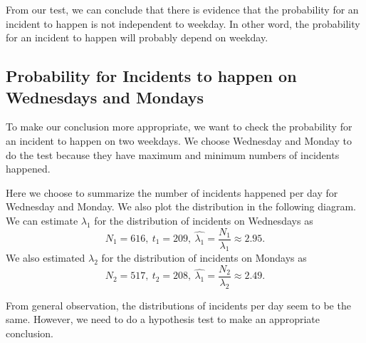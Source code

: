 \documentclass[11pt,a4paper,english]{article}
\begin{document}
From our test, we can conclude that there is evidence that the probability for an incident to happen is not independent to weekday. In other word, the probability for an incident to happen will probably depend on weekday.

\subsection{Probability for Incidents to happen on Wednesdays and Mondays}
To make our conclusion more appropriate, we want to check the probability for an incident to happen on two weekdays. 
We choose Wednesday and Monday to do the test because they have maximum and minimum numbers of incidents happened.

Here we choose to summarize the number of incidents happened per day for Wednesday and Monday. We also plot the distribution in the following diagram.
We can estimate $\lambda_{1}$ for the distribution of incidents on Wednesdays as 
\begin{equation*}
N_{1} = 616,\ t_{1} = 209,\ \hat{\lambda_{1}} = \frac{N_{1}}{\lambda_{1}} \approx 2.95.
\end{equation*}
We also estimated $\lambda_{2}$ for the distribution of incidents on Mondays as
\begin{equation*}
	N_{2} = 517,\ t_{2} = 208,\ \hat{\lambda_{1}} = \frac{N_{2}}{\lambda_{2}} \approx 2.49.
\end{equation*}

From general observation, the distributions of incidents per day seem to be the same. However, we need to do a hypothesis test to make an appropriate conclusion.
\end{document}
